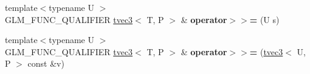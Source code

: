\begin{DoxyCompactItemize}
\item 
\hypertarget{structglm_1_1detail_1_1tvec3_ac6bc89e208ccf9b351c327559c9a630c}{{\footnotesize template$<$typename U $>$ }\\G\-L\-M\-\_\-\-F\-U\-N\-C\-\_\-\-Q\-U\-A\-L\-I\-F\-I\-E\-R \hyperlink{structglm_1_1detail_1_1tvec3}{tvec3}$<$ T, P $>$ \& {\bfseries operator$>$$>$=} (U s)}\label{structglm_1_1detail_1_1tvec3_ac6bc89e208ccf9b351c327559c9a630c}

\item 
\hypertarget{structglm_1_1detail_1_1tvec3_a20f86c2c8feefe660c7968878b794ac4}{{\footnotesize template$<$typename U $>$ }\\G\-L\-M\-\_\-\-F\-U\-N\-C\-\_\-\-Q\-U\-A\-L\-I\-F\-I\-E\-R \hyperlink{structglm_1_1detail_1_1tvec3}{tvec3}$<$ T, P $>$ \& {\bfseries operator$>$$>$=} (\hyperlink{structglm_1_1detail_1_1tvec3}{tvec3}$<$ U, P $>$ const \&v)}\label{structglm_1_1detail_1_1tvec3_a20f86c2c8feefe660c7968878b794ac4}

\end{DoxyCompactItemize}

